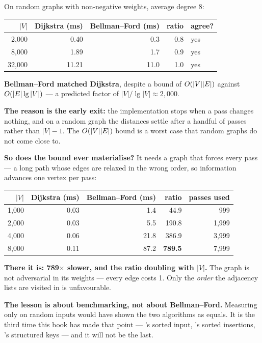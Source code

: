 \begin{worked}
On random graphs with non-negative weights, average degree 8:

\begin{center}
\begin{tabular}{@{}rrrrl@{}}
\toprule
\rowcolor{primary!15}
$|V|$ & Dijkstra (ms) & Bellman--Ford (ms) & ratio & agree? \\
\midrule
 2{,}000 &  0.40 &  0.3 & 0.8 & yes \\
 8{,}000 &  1.89 &  1.7 & 0.9 & yes \\
32{,}000 & 11.21 & 11.0 & 1.0 & yes \\
\bottomrule
\end{tabular}
\end{center}

\smallskip
\textbf{Bellman--Ford matched Dijkstra}, despite a bound of $O(|V||E|)$
against $O(|E|\operatorname{lg}|V|)$ --- a predicted factor of $|V|/\lg|V| \approx
2{,}000$.

\smallskip
\textbf{The reason is the early exit:} the implementation stops when a pass
changes nothing, and on a random graph the distances settle after a handful of
passes rather than $|V|-1$. The $O(|V||E|)$ bound is a worst case that
random graphs do not come close to.

\smallskip
\textbf{So does the bound ever materialise?} It needs a graph that forces every
pass --- a long path whose edges are relaxed in the wrong order, so information
advances one vertex per pass:

\begin{center}
\begin{tabular}{@{}rrrrr@{}}
\toprule
\rowcolor{primary!15}
$|V|$ & Dijkstra (ms) & Bellman--Ford (ms) & ratio & passes used \\
\midrule
1{,}000 & 0.03 &  1.4 &  44.9 &   999 \\
2{,}000 & 0.03 &  5.5 & 190.8 & 1{,}999 \\
4{,}000 & 0.06 & 21.8 & 386.9 & 3{,}999 \\
8{,}000 & 0.11 & 87.2 & \textbf{789.5} & 7{,}999 \\
\bottomrule
\end{tabular}
\end{center}

\smallskip
\textbf{There it is: 789$\times$ slower, and the ratio doubling with $|V|$.}
The graph is not adversarial in its weights --- every edge costs 1. Only the
\emph{order} the adjacency lists are visited in is unfavourable.

\smallskip
\textbf{The lesson is about benchmarking, not about Bellman--Ford.} Measuring
only on random inputs would have shown the two algorithms as equals. It is the
third time this book has made that point --- 's sorted input,
's sorted insertions, 's structured keys ---
and it will not be the last.
\end{worked}

